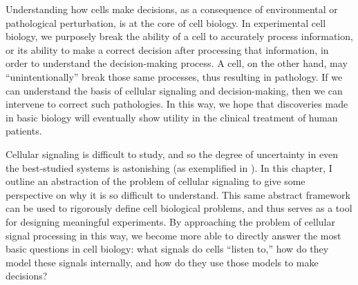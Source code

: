 Understanding how cells make
decisions, as a consequence of environmental or
pathological perturbation, is at the core of cell biology.
In experimental cell biology, we purposely break the ability of a cell
to accurately process information,
or its ability to make a correct decision after processing that information,
in order to understand the
decision-making process. A cell, on the other hand, may
``unintentionally'' break those same processes, thus
resulting in pathology.
If we can understand the basis of cellular signaling and decision-making,
then we can intervene to correct such pathologies.
In this way, we hope that discoveries made in basic biology will eventually
show utility in the clinical treatment of human patients.


Cellular signaling is difficult to study, and so the degree
of uncertainty in even the best-studied systems is astonishing (as exemplified in
).
In this chapter, I outline an abstraction of the problem of cellular
signaling to give some perspective on why it is so difficult to understand.
This same abstract framework can be used to rigorously
define cell biological problems, and thus serves as a tool
for designing meaningful experiments.
By approaching the problem of cellular signal processing in this way,
we become more able to directly
answer the most basic questions in cell biology: what signals
do cells ``listen to,'' how do they model these signals internally, and how
do they use those models to make decisions?















